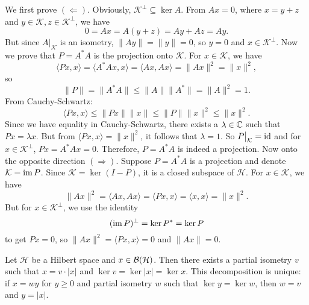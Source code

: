 \begin{myproof}
  We first prove $(\Leftarrow)$. Obviously, $\mathcal{K}^\perp \subseteq \ker A$.
  From $Ax = 0$, where $x = y + z$ and $y \in \mathcal{K}, z \in \mathcal{K}^\perp$, we have 
  $$0 = Ax = A(y + z) = Ay + Az = Ay.$$
  But since $A\big|_{\mathcal{K}}$ is an isometry, $\| Ay\| = \|y\| = 0$, so $y = 0$ and $x \in \mathcal{K}^\perp$.
  Now we prove that $P = A^* A$ is the projection onto $\mathcal{K}$.
  For $x \in \mathcal{K}$, we have
  $$\langle Px, x \rangle = \langle A^* A x, x\rangle = \langle Ax, Ax\rangle = \|Ax\|^2 = \|x\|^2,$$
  so $$\|P\|  = \|A^* A\| \leq \|A\| \|A^*\| = \|A\|^2 = 1.$$
  From Cauchy-Schwartz:
  $$\langle Px, x\rangle \leq \|Px\| \|x\| \leq \|P\| \|x\|^2 \leq \|x\|^2.$$
  Since we have equality in Cauchy-Schwartz, there exists a $\lambda \in \mathbb {C}$ such that $Px = \lambda x$.
  But from $\langle Px, x\rangle = \|x\|^2$, it follows that $\lambda = 1$. So $P\big|_{\mathcal{K}} = \operatorname{id}$
  and for $x \in \mathcal{K}^\perp$, $Px = A^* Ax = 0$. Therefore, $P = A^* A$ is indeed a projection.
  Now onto the opposite direction $(\Rightarrow)$. Suppose $P = A^* A$ is a projection
  and denote $\mathcal{K} = \operatorname{im} P$. Since $\mathcal{K} = \ker (I - P)$, it is a closed subspace of $\mathcal{H}$.
  For $x \in \mathcal{K}$, we have 
  $$\| Ax\|^2 = \langle Ax , Ax\rangle = \langle Px, x\rangle = \langle x, x\rangle = \|x\|^2.$$
  But for $x \in \mathcal{K}^\perp$, we use the identity 
  $$(\operatorname{im} P)^\perp = \ker P^* = \ker P$$
  to get $Px = 0$, so $\| A x\|^2 = \langle Px, x\rangle = 0$ and $\| Ax\| = 0$.
\end{myproof}

\begin{theorem}
  Let $\mathcal{H}$ be a Hilbert space and $x \in \operatorname{\mathcal{B} (\mathcal{H})}$.
  Then there exists a partial isometry $v$ such that $x = v \cdot |x|$ and 
  $\ker v = \ker |x| = \ker x$. This decomposition is unique: if $x = wy$
  for $y \geq 0$ and partial isometry $w$ such that $\ker y = \ker w$, then $w = v$ and $y = |x|$. 
\end{theorem}

